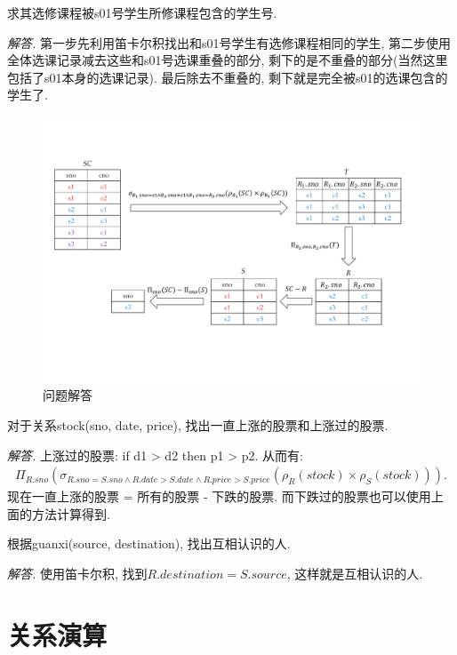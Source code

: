 \begin{problem}
    求其选修课程被s01号学生所修课程包含的学生号.
\end{problem}
\textit{ 解答. }第一步先利用笛卡尔积找出和s01号学生有选修课程相同的学生, 第二步使用全体选课记录减去这些和s01号选课重叠的部分, 剩下的是不重叠的部分(当然这里包括了s01本身的选课记录). 最后除去不重叠的, 剩下就是完全被s01的选课包含的学生了.
\begin{figure}[H]
    \centering
    \includegraphics[width=\textwidth]{figure/一道题.pdf}
    \caption{问题解答}
\end{figure}

\begin{problem}
    对于关系stock(sno, date, price), 找出一直上涨的股票和上涨过的股票.
\end{problem}
\textit{ 解答. }上涨过的股票: if d1 > d2 then p1 > p2. 从而有:
\begin{align*}
    \Pi_{R.sno}(\sigma_{R.sno=S.sno\land R.date > S.date \land R.price > S.price}(\rho_R(stock) \times \rho_S(stock))).
\end{align*}
现在一直上涨的股票 = 所有的股票 - 下跌的股票. 而下跌过的股票也可以使用上面的方法计算得到.

\begin{problem}
    根据guanxi(source, destination), 找出互相认识的人.
\end{problem}
\textit{ 解答. }使用笛卡尔积, 找到$R.destination = S.source$, 这样就是互相认识的人.

\section{关系演算}

